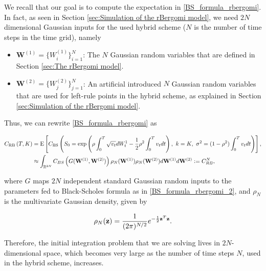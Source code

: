 We recall that our goal is to compute the expectation in \eqref{BS_formula_rbergomi}. In fact, as seen in Section \ref{sec:Simulation of the rBergomi model}, we need   $2N$ dimensional Gaussian inputs for the used  hybrid  scheme ($N$ is the number of time steps in  the time grid), namely
\begin{itemize}
	\item $\mathbf{W}^{(1)}=\{W^{(1)}_i\}_{i=1}^N$: The $N$ Gaussian random variables that are defined in Section  \ref{sec:The rBergomi model}.
	\item $\mathbf{W}^{(2)}=\{W^{(2)}_j\}_{j=1}^N$: An artificial introduced $N$ Gaussian random variables that are used for left-rule points in the hybrid scheme, as explained in Section  \ref{sec:Simulation of the rBergomi model}.
\end{itemize}

Thus, we can rewrite \eqref{BS_formula_rbergomi} as 


\begin{align}\label{BS_formula_rbergomi_2}
C_{\text{RB}}\left( T, K \right)&=\text{E}\left[C_{\text{BS}}\left( S_0 = \operatorname{exp}\left(\rho \int_0^T \sqrt{v_t} dW_t^1 - \frac{1}{2}
\rho^2 \int_0^T v_t dt\right),\ k = K, \ \sigma^2 = (1-\rho^2)
\int_0^T v_t dt \right) \right], \nonumber \\
&\approx \int_{\mathbb{R}^{2N}} C_{BS} \left(G(\mathbf{W}^{(1)},\mathbf{W}^{(2)})\right) \rho_{N}(\mathbf{W}^{(1)})  \rho_{N}(\mathbf{W}^{(2)}) d\mathbf{W}^{(1)} d\mathbf{W}^{(2)}:=C_{RB}^{N},
\end{align}

where $G$  maps  $2N$ independent standard Gaussian random inputs to the parameters fed to Black-Scholes formula as in \eqref{BS_formula_rbergomi_2}, and  $\rho_N$ is the multivariate Gaussian density, given by 

\begin{equation*}\label{eq: multivariate gaussian distribution}
\rho_N(\mathbf{z})=\frac{1}{(2 \pi)^{N/2}} e^{-\frac{1}{2} \mathbf{z}^T \mathbf{z}} .
\end{equation*} 

Therefore, the initial integration problem that we are solving lives in $2 N$-dimensional space, which becomes very large as the number of time steps $N$, used in the hybrid scheme, increases.


